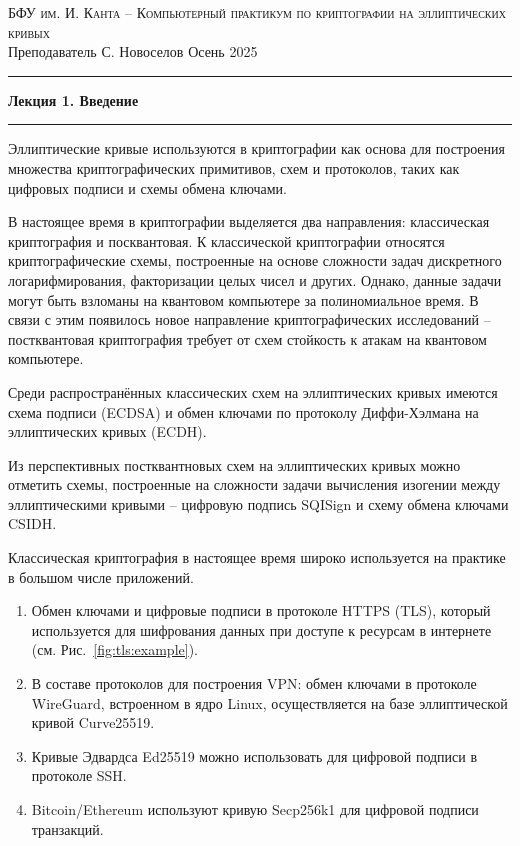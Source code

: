 \documentclass[11pt]{exam}
\theoremstyle{definition}
\begin{document}
	
	{\noindent
		\textsc{БФУ им. И. Канта -- Компьютерный практикум по криптографии на эллиптических кривых }\\[5pt]
		Преподаватель {С. Новоселов}   \hfill{Осень 2025\\}
	\hrule
	\begin{center}
		{\LARGE\textbf{
				Лекция 1. Введение \\[5pt]
		}}
		
	\end{center}
	\hrule \vspace{5mm}
	
	\thispagestyle{empty}
	
	Эллиптические кривые используются в криптографии как основа для построения множества криптографических примитивов, схем и протоколов, таких как цифровых подписи и схемы обмена ключами.
	
	В настоящее время в криптографии выделяется два направления: классическая криптография и посквантовая. К классической криптографии относятся криптографические схемы, построенные на основе сложности задач дискретного логарифмирования, факторизации целых чисел и других. Однако, данные задачи могут быть взломаны на квантовом компьютере за полиномиальное время. В связи с этим появилось новое направление криптографических исследований -- постквантовая криптография требует от схем стойкость к атакам на квантовом компьютере.
	
	Среди распространённых классических схем на эллиптических кривых имеются схема подписи (ECDSA) и обмен ключами по протоколу Диффи-Хэлмана на эллиптических кривых (ECDH).
	
	Из перспективных постквантновых схем на эллиптических кривых можно отметить схемы, построенные на сложности задачи вычисления изогении между эллиптическими кривыми --  цифровую подпись SQISign и схему обмена ключами CSIDH.
	
	Классическая криптография в настоящее время широко используется на практике в большом числе приложений.
	
	\begin{enumerate}
		\item Обмен ключами и цифровые подписи в протоколе HTTPS (TLS), который используется для шифрования данных при доступе к ресурсам в интернете (см. Рис.~\ref{fig:tls:example}).
		\item В составе протоколов для построения VPN: обмен ключами в протоколе WireGuard, встроенном в ядро Linux, осуществляется на базе эллиптической кривой Curve25519.
		\item Кривые Эдвардса Ed25519 можно использовать для цифровой подписи в протоколе SSH.
		\item Bitcoin/Ethereum используют кривую Secp256k1 для цифровой
		подписи транзакций.
	\end{enumerate}

}
\end{document}
